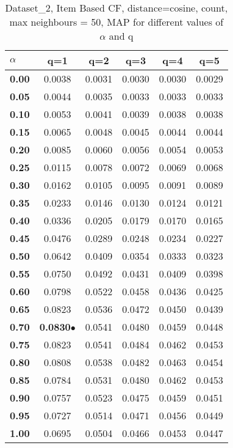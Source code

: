\begin{table}
\begin{center}
\begin{tabular}{ | l || c | c | c | c | c |}
\hline
\textbf{$\alpha$} & \textbf{q=1} & \textbf{q=2} & \textbf{q=3} & \textbf{q=4} & \textbf{q=5} \\
\hline
\textbf{0.00} & 0.0038 & 0.0031 & 0.0030 & 0.0030 & 0.0029\\
\hline
\textbf{0.05} & 0.0044 & 0.0035 & 0.0033 & 0.0033 & 0.0033\\
\hline
\textbf{0.10} & 0.0053 & 0.0041 & 0.0039 & 0.0038 & 0.0038\\
\hline
\textbf{0.15} & 0.0065 & 0.0048 & 0.0045 & 0.0044 & 0.0044\\
\hline
\textbf{0.20} & 0.0085 & 0.0060 & 0.0056 & 0.0054 & 0.0053\\
\hline
\textbf{0.25} & 0.0115 & 0.0078 & 0.0072 & 0.0069 & 0.0068\\
\hline
\textbf{0.30} & 0.0162 & 0.0105 & 0.0095 & 0.0091 & 0.0089\\
\hline
\textbf{0.35} & 0.0233 & 0.0146 & 0.0130 & 0.0124 & 0.0121\\
\hline
\textbf{0.40} & 0.0336 & 0.0205 & 0.0179 & 0.0170 & 0.0165\\
\hline
\textbf{0.45} & 0.0476 & 0.0289 & 0.0248 & 0.0234 & 0.0227\\
\hline
\textbf{0.50} & 0.0642 & 0.0409 & 0.0354 & 0.0333 & 0.0323\\
\hline
\textbf{0.55} & 0.0750 & 0.0492 & 0.0431 & 0.0409 & 0.0398\\
\hline
\textbf{0.60} & 0.0798 & 0.0522 & 0.0458 & 0.0436 & 0.0425\\
\hline
\textbf{0.65} & 0.0823 & 0.0536 & 0.0472 & 0.0450 & 0.0439\\
\hline
\textbf{0.70} & \textbf{0.0830}$\bullet$ & 0.0541 & 0.0480 & 0.0459 & 0.0448\\
\hline
\textbf{0.75} & 0.0823 & 0.0541 & 0.0484 & 0.0462 & 0.0453\\
\hline
\textbf{0.80} & 0.0808 & 0.0538 & 0.0482 & 0.0463 & 0.0454\\
\hline
\textbf{0.85} & 0.0784 & 0.0531 & 0.0480 & 0.0462 & 0.0453\\
\hline
\textbf{0.90} & 0.0757 & 0.0523 & 0.0475 & 0.0459 & 0.0451\\
\hline
\textbf{0.95} & 0.0727 & 0.0514 & 0.0471 & 0.0456 & 0.0449\\
\hline
\textbf{1.00} & 0.0695 & 0.0504 & 0.0466 & 0.0453 & 0.0447\\
\hline
\end{tabular}
\caption{Dataset\_2, Item Based CF, distance=cosine, count, max neighbours = 50, MAP for different values of $\alpha$ and q}
\label{table:MAP_Dataset_2_icf_cosine_count_mnn=50}
\end{center}
\end{table}
